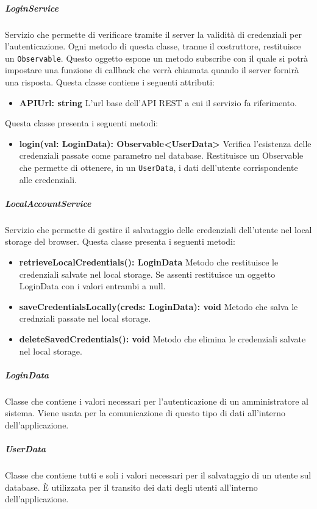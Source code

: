 \subparagraph{LoginService}
Servizio che permette di verificare tramite il server la validità di credenziali per l'autenticazione. Ogni metodo di questa classe, tranne il costruttore, restituisce un \texttt{Observable}. Questo oggetto espone un metodo subscribe con il quale si potrà impostare una funzione di callback che verrà chiamata quando il server fornirà una risposta. \newline
Questa classe contiene i seguenti attributi:
\begin{itemize}
	\item \textbf{APIUrl: string}
	L'url base dell'API REST a cui il servizio fa riferimento.
\end{itemize}
Questa classe presenta i seguenti metodi:
\begin{itemize}
	\item \textbf{login(val: LoginData): Observable<UserData>} \newline
	Verifica l'esistenza delle credenziali passate come parametro nel database. Restituisce un Observable che permette di ottenere, in un \texttt{UserData}, i dati dell'utente corrispondente alle credenziali.
\end{itemize}
\subparagraph{LocalAccountService}
Servizio che permette di gestire il salvataggio delle credenziali dell'utente nel local storage del browser. \newline
Questa classe presenta i seguenti metodi:
\begin{itemize}
	\item \textbf{retrieveLocalCredentials(): LoginData} \newline
	Metodo che restituisce le credenziali salvate nel local storage. Se assenti restituisce un oggetto LoginData con i valori entrambi a null.
	\item \textbf{saveCredentialsLocally(creds: LoginData): void} \newline
	Metodo che salva le crednziali passate nel local storage.
	\item \textbf{deleteSavedCredentials(): void} \newline
	Metodo che elimina le credenziali salvate nel local storage.
	
\end{itemize}
\subparagraph{LoginData}
Classe che contiene i valori necessari per l'autenticazione di un amministratore al sistema. Viene usata per la comunicazione di questo tipo di dati all'interno dell'applicazione. \newline
\subparagraph{UserData}
Classe che contiene tutti e soli i valori necessari per il salvataggio di un utente sul database. È utilizzata per il transito dei dati degli utenti all'interno dell'applicazione. \newline
